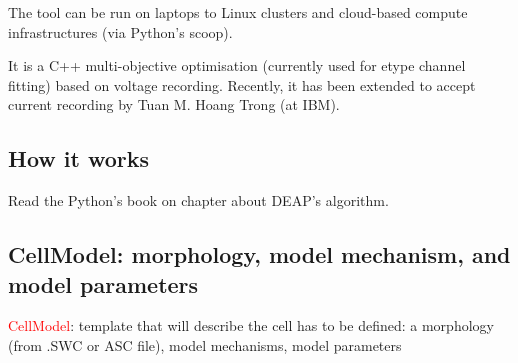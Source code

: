 The tool can be run on  laptops to Linux clusters and cloud-based compute
infrastructures (via Python's scoop).

It is a C++ multi-objective optimisation (currently used for etype channel
fitting) based on voltage recording. Recently, it has been extended to accept
current recording by Tuan M. Hoang Trong (at IBM).

\subsection{How it works}

Read the Python's book on chapter about DEAP's algorithm.


\subsection{CellModel: morphology, model mechanism, and model parameters}
\label{sec:cell-model}

\textcolor{red}{CellModel}: template that will describe the cell has to be
defined: a morphology (from .SWC or ASC file), model mechanisms, model
parameters

